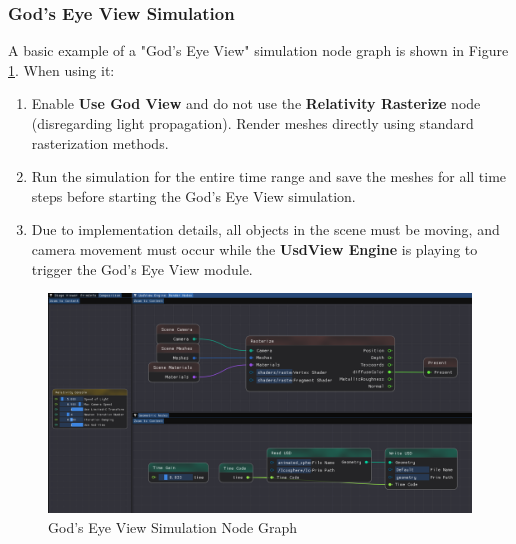 \documentclass{article}
\begin{document}
\subsubsection*{God's Eye View Simulation}
A basic example of a "God's Eye View" simulation node graph is shown in Figure \ref{godview}. When using it:
\begin{enumerate}[(1)]
    \item Enable \textbf{Use God View} and do not use the \textbf{Relativity Rasterize} node (disregarding light propagation). Render meshes directly using standard rasterization methods.
    \item Run the simulation for the entire time range and save the meshes for all time steps before starting the God's Eye View simulation.
    \item Due to implementation details, all objects in the scene must be moving, and camera movement must occur while the \textbf{UsdView Engine} is playing to trigger the God's Eye View module.
\end{enumerate}

\begin{figure}[htbp]
    \centering
    \setlength{\abovecaptionskip}{0.cm}
    \begin{minipage}[b]{0.85\linewidth}
        \centering
        \includegraphics[width=\textwidth]{GodView.png}
        \caption{God's Eye View Simulation Node Graph}
        \label{godview}
    \end{minipage}
\end{figure}
\newpage
\end{document}
